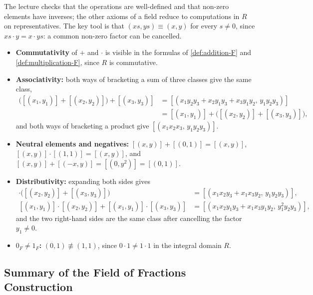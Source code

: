 \begin{aiNote}
The lecture checks that the operations are well-defined and that non-zero elements have inverses; the other axioms of a field reduce to computations in $R$ on representatives. The key tool is that $(x s, y s) \equiv (x, y)$ for every $s \neq 0$, since $x s \cdot y = x \cdot y s$: a common non-zero factor can be cancelled.
\begin{itemize}
    \item \textbf{Commutativity} of $+$ and $\cdot$ is visible in the formulas of \cref{def:addition-F} and \cref{def:multiplication-F}, since $R$ is commutative.
    \item \textbf{Associativity:} both ways of bracketing a sum of three classes give the same class,
    \begin{align*}
    \bigl([(x_1, y_1)] + [(x_2, y_2)]\bigr) + [(x_3, y_3)]
    &= [(x_1 y_2 y_3 + x_2 y_1 y_3 + x_3 y_1 y_2, \, y_1 y_2 y_3)] \\
    &= [(x_1, y_1)] + \bigl([(x_2, y_2)] + [(x_3, y_3)]\bigr),
    \end{align*}
    and both ways of bracketing a product give $[(x_1 x_2 x_3, \, y_1 y_2 y_3)]$.
    \item \textbf{Neutral elements and negatives:} $[(x, y)] + [(0, 1)] = [(x, y)]$, $[(x, y)] \cdot [(1, 1)] = [(x, y)]$, and $[(x, y)] + [(-x, y)] = [(0, y^2)] = [(0, 1)]$.
    \item \textbf{Distributivity:} expanding both sides gives
    \begin{align*}
    [(x_1, y_1)] \cdot \bigl([(x_2, y_2)] + [(x_3, y_3)]\bigr) &= [(x_1 x_2 y_3 + x_1 x_3 y_2, \, y_1 y_2 y_3)], \\
    [(x_1, y_1)] \cdot [(x_2, y_2)] + [(x_1, y_1)] \cdot [(x_3, y_3)] &= [(x_1 x_2 y_1 y_3 + x_1 x_3 y_1 y_2, \, y_1^2 y_2 y_3)],
    \end{align*}
    and the two right-hand sides are the same class after cancelling the factor $y_1 \neq 0$.
    \item \textbf{$0_F \neq 1_F$:} $(0, 1) \not\equiv (1, 1)$, since $0 \cdot 1 \neq 1 \cdot 1$ in the integral domain $R$.
\end{itemize}
\end{aiNote}

\subsection{Summary of the Field of Fractions Construction}

